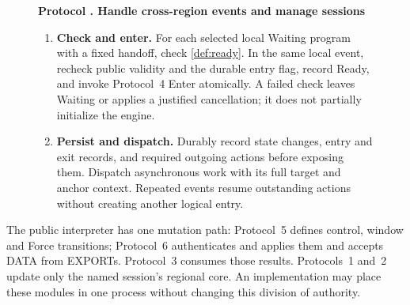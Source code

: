 \documentclass[11pt,a4paper]{article}
\newcounter{protocol}
\newenvironment{protocol}[3][htbp]{\begin{figure}[#1]\refstepcounter{protocol}\label{#2}
\begin{mdframed}[linewidth=.6pt,skipabove=0pt,skipbelow=0pt,
innertopmargin=7pt,innerbottommargin=7pt]\small
\textbf{Protocol \theprotocol. #3}\par\smallskip}{\end{mdframed}\end{figure}}
\begin{document}
\begin{protocol}[H]{alg:rotation}{Handle cross-region events and manage sessions}
\begin{enumerate}[label=\textbf{\arabic*)},itemsep=3pt]
fresh actions regardless of phase. For each known session snapshot in
that version, including unentered and archived programs, run the complete
closure relay and idempotent \texttt{RequestClose} of \cref{sec:retirement}.
If the snapshot is not yet known, retain a pending relay obligation.
Any later old-session packet with the necessary context triggers this
control response before ordinary processing. Keep signed routing,
historical evidence and publication duties. Apply terminal receipts
to entered source engines under the existing Completion rule.
\item \textbf{Check and enter.} For each selected local Waiting
program with a fixed handoff, check \cref{def:ready}. In the same local
event, recheck public validity and the durable entry flag, record Ready,
and invoke Protocol~4 Enter atomically. A failed check leaves Waiting
or applies a justified cancellation; it does not partially initialize
the engine.
\item \textbf{Persist and dispatch.} Durably record state changes,
entry and exit records, and required outgoing actions before exposing
them. Dispatch asynchronous work with its full target and anchor
context. Repeated events resume outstanding actions without creating
another logical entry.
\end{enumerate}
\end{protocol}

The public interpreter has one mutation path: Protocol~5 defines
control, window and Force transitions; Protocol~6 authenticates and
applies them and accepts DATA from EXPORTs. Protocol~3 consumes those results.
Protocols~1 and~2 update only the named session's regional core.
An implementation may place these modules in one process without
changing this division of authority.
\end{document}
